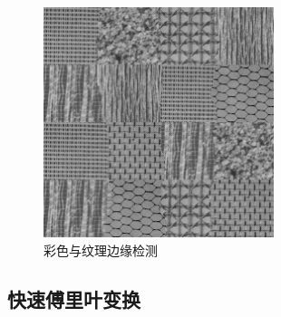 \documentclass[11pt]{ctexart}
\begin{document}
\begin{figure}[htbp]
{\begin{minipage}[t]{0.4\linewidth}
            \centering
            \includegraphics[width=0.6\textwidth]{./3/纹理图像.jpg}
        \end{minipage}
        }
        \centering
        \caption{彩色与纹理边缘检测}\label{fig:digit}
  \end{figure}
  
\newpage
  
\subsection* {快速傅里叶变换}
\end{document}

